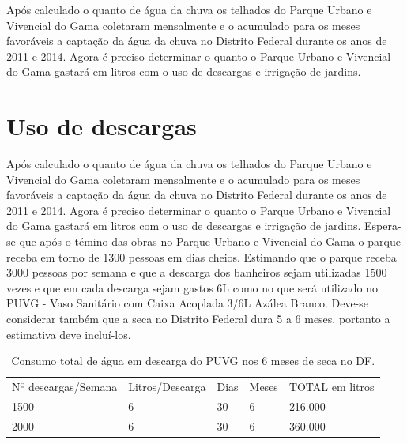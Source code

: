 	Após calculado o quanto de água da chuva os telhados do Parque Urbano e Vivencial do Gama coletaram mensalmente e o acumulado para os meses favoráveis a captação da água da chuva no Distrito Federal durante os anos de 2011 e 2014. Agora é preciso determinar o quanto o Parque Urbano e Vivencial do Gama gastará em litros com o uso de descargas e irrigação de jardins.  
	
\section{Uso de descargas}

	Após calculado o quanto de água da chuva os telhados do Parque Urbano e Vivencial do Gama coletaram mensalmente e o acumulado para os meses favoráveis a captação da água da chuva no Distrito Federal durante os anos de 2011 e 2014. Agora é preciso determinar o quanto o Parque Urbano e Vivencial do Gama gastará em litros com o uso de descargas e irrigação de jardins.  
	Espera-se que após o témino das obras no Parque Urbano e Vivencial do Gama o parque receba em torno de 1300 pessoas em dias cheios. Estimando que o parque receba 3000 pessoas por semana e que a descarga dos banheiros sejam utilizadas 1500 vezes e que em cada descarga sejam gastos 6L como no que será utilizado no PUVG - Vaso Sanitário com Caixa Acoplada 3/6L Azálea Branco. Deve-se considerar também que a seca no Distrito Federal dura 5 a 6 meses, portanto a estimativa deve incluí-los. 
	
\begin{table}[h]
\centering
\caption{Consumo total de água em descarga do PUVG nos 6 meses de seca no DF.}
\label{Consumo total de água em descarga do PUVG nos 6 meses de seca no DF.}
\begin{tabular}{lllll}
 &  &  &  &  \\ \hline
\multicolumn{1}{|l|}{Nº descargas/Semana} & \multicolumn{1}{l|}{Litros/Descarga} & \multicolumn{1}{l|}{Dias} & \multicolumn{1}{l|}{Meses} & \multicolumn{1}{l|}{TOTAL em litros} \\ \hline
\multicolumn{1}{|l|}{1500} & \multicolumn{1}{l|}{6} & \multicolumn{1}{l|}{30} & \multicolumn{1}{l|}{6} & \multicolumn{1}{l|}{216.000} \\ \hline
\multicolumn{1}{|l|}{2000} & \multicolumn{1}{l|}{6} & \multicolumn{1}{l|}{30} & \multicolumn{1}{l|}{6} & \multicolumn{1}{l|}{360.000} \\ \hline
\end{tabular}
\end{table}

